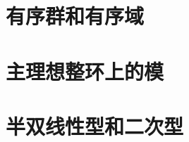 \documentclass[UTF8,10pt, a4paper, oneside,scheme=plain]{ctexbook}
\begin{document}
%

\part{有序群和有序域}



\part{主理想整环上的模}




%

\part{半双线性型和二次型}




%
































\backmatter
\end{document}
